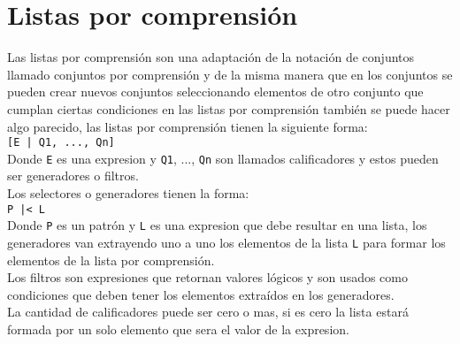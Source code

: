    \section{Listas por comprensión}
      Las listas por comprensión son una adaptación de la notación de conjuntos llamado conjuntos por comprensión y de la misma manera que en los conjuntos se pueden crear nuevos conjuntos seleccionando elementos de otro conjunto que cumplan ciertas condiciones en las listas por comprensión también se puede hacer algo parecido, las listas por comprensión tienen la siguiente forma:
      \\
      
      \texttt{[E | Q1, ..., Qn]}
      \\
      
      Donde \texttt{E} es una expresion y \texttt{Q1}, ..., \texttt{Qn} son llamados calificadores y estos pueden ser generadores o filtros.
      \\
      
      Los selectores o generadores tienen la forma:
      \\
      
      \texttt{P |<~L}
      \\
      
      Donde \texttt{P} es un patrón y \texttt{L} es una expresion que debe resultar en una lista, los generadores van extrayendo uno a uno los elementos de la lista \texttt{L} para formar los elementos de la lista por comprensión.
      \\
      
      Los filtros son expresiones que retornan valores lógicos y son usados como condiciones que deben tener los elementos extraídos en los generadores.
      \\
      
      La cantidad de calificadores puede ser cero o mas, si es cero la lista estará formada por un solo elemento que sera el valor de la expresion.
      
      \begin{fxcode}
         \arrowcode{[x | x |<~[1 .. 10], Odd x]}\\
         \outcode{[1, 3, 5, 7, 9]}\\
         \arrowcode{[2 | ]}\\
         \outcode{[2]}\\
         \arrowcode{[x | ]}\\
         \outcode{[x]}\\
         \arrowcode{[2*n - 1 | n |<~[1 .. 4]]}\\
         \outcode{[1, 3, 5, 7]}
      \end{fxcode}
   
